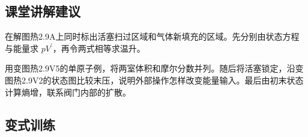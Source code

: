\documentclass[UTF8,fontset=fandol,a4paper,11pt]{ctexart}
\begin{document}


\subsection*{课堂讲解建议}

在解图热2.9A上同时标出活塞扫过区域和气体新填充的区域。先分别由状态方程与能量求 $pV^{\prime}$，再令两式相等求温升。

用变图热2.9V5的单原子例，将两室体积和摩尔分数并列。随后将活塞锁定，沿变图热2.9V2的状态图比较末压，说明外部操作怎样改变能量输入。最后由初末状态计算熵增，联系阀门内部的扩散。



\subsection*{变式训练}
\end{document}
